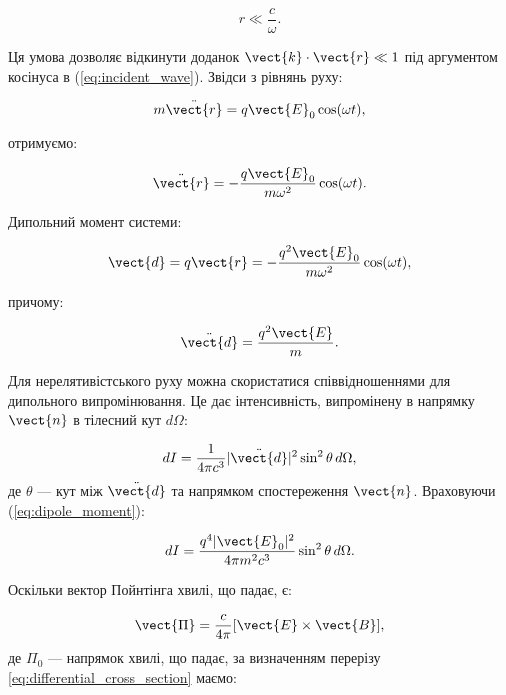 \begin{equation*}
r \ll \frac{c}{\omega}.
\end{equation*}

Ця умова дозволяє відкинути доданок \( \vect{k} \cdot \vect{r} \ll 1 \) під аргументом косінуса в (\ref{eq:incident_wave}). Звідси з рівнянь руху:

\begin{equation*}
m \ddot{\vect{r}} = q \vect{E}_0 \cos(\omega t),
\end{equation*}

отримуємо:

\begin{equation*}
\ddot{\vect{r}} = -\frac{q \vect{E}_0}{m \omega^2} \cos(\omega t).
\end{equation*}

Дипольний момент системи:

\begin{equation*}
\vect{d} = q \vect{r} = -\frac{q^2 \vect{E}_0}{m \omega^2} \cos(\omega t),
\end{equation*}

причому:

\begin{equation}
\ddot{\vect{d}} = \frac{q^2 \vect{E}}{m}.
\label{eq:dipole_moment}
\end{equation}

Для нерелятивістського руху можна скористатися співвідношеннями для дипольного випромінювання. Це дає інтенсивність, випромінену в напрямку \( \vect{n}
\) в тілесний кут \( d\Omega \):

\begin{equation}
dI = \frac{1}{4\pi c^3} |\ddot{\vect{d}}|^2 \sin^2 \theta \, d\Omega,
\label{eq:intensity_dipole}
\end{equation}
де \( \theta \) --- кут між \( \ddot{\vect{d}} \) та напрямком спостереження \( \vect{n} \). Враховуючи (\ref{eq:dipole_moment}):

\begin{equation*}
dI = \frac{q^4 |\vect{E}_0|^2}{4\pi m^2 c^3} \sin^2 \theta \, d\Omega.
\end{equation*}

Оскільки вектор Пойнтінга хвилі, що падає, є:

\begin{equation*}
\vect{\Pi} = \frac{c}{4\pi} [\vect{E} \times \vect{B}],
\end{equation*}
де \( \Pi_0 \) --- напрямок хвилі, що падає, за визначенням перерізу \eqref{eq:differential_cross_section} маємо:

